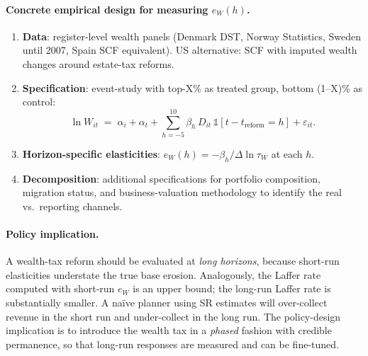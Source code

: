 \documentclass[11pt,a4paper]{article}
\begin{document}
\paragraph{Concrete empirical design for measuring $e_{W}(h)$.}
\begin{enumerate}[leftmargin=*,itemsep=1pt]
    \item \textbf{Data}: register-level wealth panels (Denmark DST, Norway Statistics, Sweden until 2007, Spain SCF equivalent). US alternative: SCF with imputed wealth changes around estate-tax reforms.
    \item \textbf{Specification}: event-study with top-X\% as treated group, bottom (1--X)\% as control:
    \[
    \ln W_{it}\;=\;\alpha_{i}+\alpha_{t}+\sum_{h=-5}^{10}\beta_{h}\,D_{it}\,\mathbb{1}[t-t_{\text{reform}}=h]+\varepsilon_{it}.
    \]
    \item \textbf{Horizon-specific elasticities}: $e_{W}(h)=-\beta_{h}/\Delta\ln\tau_{W}$ at each $h$.
    \item \textbf{Decomposition}: additional specifications for portfolio composition, migration status, and business-valuation methodology to identify the real vs.\ reporting channels.
\end{enumerate}

\paragraph{Policy implication.}
A wealth-tax reform should be evaluated at \emph{long horizons}, because short-run elasticities understate the true base erosion. Analogously, the Laffer rate computed with short-run $e_{W}$ is an upper bound; the long-run Laffer rate is substantially smaller. A naïve planner using SR estimates will over-collect revenue in the short run and under-collect in the long run. The policy-design implication is to introduce the wealth tax in a \emph{phased} fashion with credible permanence, so that long-run responses are measured and can be fine-tuned.

\end{document}
